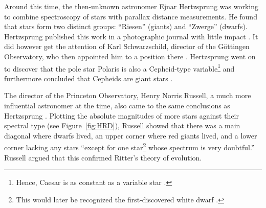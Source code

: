 
Around this time, the then-unknown astronomer Ejnar Hertzsprung was working to combine spectroscopy of stars with parallax distance measurements. 
He found that stars form two distinct groups: ``Riesen'' (giants) and ``Zwerge'' (dwarfs). 
Hertzsprung published this work in a photographic journal with little impact \citep{1905WisZP...3..442H, 1907WisZP...5...86H}. 
It did however get the attention of Karl Schwarzschild, director of the G\"ottingen Observatory, who then appointed him to a position there \citep[e.g.,][]{bolt2007biographical}. 
Hertzsprung went on to discover that the pole star Polaris is also a Cepheid-type variable\footnote{ Hence, Caesar is as constant as a variable star \citep{shakespeare}.} \citep{1911AN....189...89H} and furthermore concluded that Cepheids are giant stars \citep{1913AN....196..201H}. 

The director of the Princeton Observatory, Henry Norris Russell, a much more influential astronomer at the time, also came to the same conclusions as Hertzsprung \citep[e.g.,][]{1913Obs....36..324R, 1913Sci....37..651R}. 
Plotting the absolute magnitudes of more stars against their spectral type (see Figure~\ref{fig:HRD}), Russell showed that there was a main diagonal where dwarfs lived, an upper corner where red giants lived, and a lower corner lacking any stars ``except for one star\footnote{ This would later be recognized the first-discovered white dwarf \citep[e.g.,][]{1958whdw.book.....S}.} whose spectrum is very doubtful.'' 
Russell argued that this confirmed Ritter's theory of evolution. 

